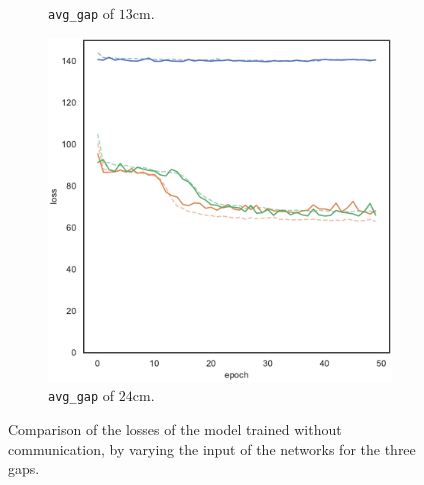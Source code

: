 \begin{figure}[!htb]
\begin{center}
\begin{subfigure}[h]{0.32\textwidth}
			\caption{\texttt{avg\_gap} of $13$\gls{cm}.}
		\end{subfigure}
		\hfill
		\begin{subfigure}[h]{0.32\textwidth}
			\includegraphics[width=\textwidth]{contents/images/task1-comm/loss-distributed-gap_24@copy}
			\caption{\texttt{avg\_gap} of $24$\gls{cm}.}
		\end{subfigure}
	\end{center}
	\vspace{-0.5cm}
	\caption[Summary, in terms of loss, of the first set of experiments (no 
	communication).]{Comparison of the losses of the model trained without 
		communication, by varying the input of the networks for the three gaps.}
	\label{fig:distlossgaps}
\end{figure}

